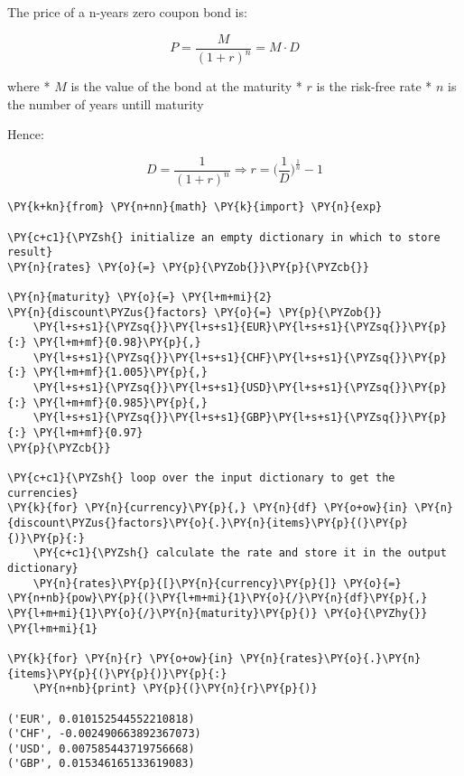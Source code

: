 \begin{Answer}
The price of a n-years zero coupon bond is:

\[ P = \frac{M}{(1+r)^{n}} = M\cdot D \]

where * \(M\) is the value of the bond at the maturity * \(r\) is the
risk-free rate * \(n\) is the number of years untill maturity

Hence:

\[ D = \frac{1}{(1+r)^{n}} \Longrightarrow r = \Big(\frac{1}{D}\Big)^{\frac{1}{n}} - 1\]

\begin{tcolorbox}[size=fbox, boxrule=1pt, colback=cellbackground, colframe=cellborder]
\begin{Verbatim}[commandchars=\\\{\}]
\PY{k+kn}{from} \PY{n+nn}{math} \PY{k}{import} \PY{n}{exp}

\PY{c+c1}{\PYZsh{} initialize an empty dictionary in which to store result}
\PY{n}{rates} \PY{o}{=} \PY{p}{\PYZob{}}\PY{p}{\PYZcb{}}

\PY{n}{maturity} \PY{o}{=} \PY{l+m+mi}{2}
\PY{n}{discount\PYZus{}factors} \PY{o}{=} \PY{p}{\PYZob{}}
    \PY{l+s+s1}{\PYZsq{}}\PY{l+s+s1}{EUR}\PY{l+s+s1}{\PYZsq{}}\PY{p}{:} \PY{l+m+mf}{0.98}\PY{p}{,}
    \PY{l+s+s1}{\PYZsq{}}\PY{l+s+s1}{CHF}\PY{l+s+s1}{\PYZsq{}}\PY{p}{:} \PY{l+m+mf}{1.005}\PY{p}{,}
    \PY{l+s+s1}{\PYZsq{}}\PY{l+s+s1}{USD}\PY{l+s+s1}{\PYZsq{}}\PY{p}{:} \PY{l+m+mf}{0.985}\PY{p}{,}
    \PY{l+s+s1}{\PYZsq{}}\PY{l+s+s1}{GBP}\PY{l+s+s1}{\PYZsq{}}\PY{p}{:} \PY{l+m+mf}{0.97}
\PY{p}{\PYZcb{}}

\PY{c+c1}{\PYZsh{} loop over the input dictionary to get the currencies}
\PY{k}{for} \PY{n}{currency}\PY{p}{,} \PY{n}{df} \PY{o+ow}{in} \PY{n}{discount\PYZus{}factors}\PY{o}{.}\PY{n}{items}\PY{p}{(}\PY{p}{)}\PY{p}{:}
    \PY{c+c1}{\PYZsh{} calculate the rate and store it in the output dictionary}
    \PY{n}{rates}\PY{p}{[}\PY{n}{currency}\PY{p}{]} \PY{o}{=} \PY{n+nb}{pow}\PY{p}{(}\PY{l+m+mi}{1}\PY{o}{/}\PY{n}{df}\PY{p}{,} \PY{l+m+mi}{1}\PY{o}{/}\PY{n}{maturity}\PY{p}{)} \PY{o}{\PYZhy{}} \PY{l+m+mi}{1}
    
\PY{k}{for} \PY{n}{r} \PY{o+ow}{in} \PY{n}{rates}\PY{o}{.}\PY{n}{items}\PY{p}{(}\PY{p}{)}\PY{p}{:}    
    \PY{n+nb}{print} \PY{p}{(}\PY{n}{r}\PY{p}{)}

('EUR', 0.010152544552210818)
('CHF', -0.002490663892367073)
('USD', 0.007585443719756668)
('GBP', 0.015346165133619083)
\end{Verbatim}
\end{tcolorbox}
\end{Answer}
